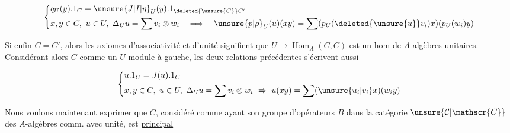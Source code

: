 

\[
\left\{\begin{aligned}
&q_U(y).1_C=\unsure{J|I|\eta}_U(y).1_{\deleted{\unsure{C}}C'}\\
&x,y\in C,\ u\in U,\ \Delta_U u=\sum v_i\otimes w_i\quad\Longrightarrow\quad
\unsure{p|\rho}_U(u)(xy)=\sum(p_U(\deleted{\unsure{u}}v_i)x)(p_U(w_i)y)
\end{aligned}\right.
\]

Si enfin $C=C'$, alors les  axiomes d'associativité et d'unité signifient que  $U\to\operatorname{Hom}_A(C,C)$ est un \uline{hom de $A$-algèbres unitaires}. Considérant \uline{alors $C$ comme un $U$-module}  \uline{à gauche}, les deux relations précédentes s'écrivent aussi

\[
\left\{\begin{aligned}
&u.1_C=J(u).1_C\\
&x,y\in C,\ u\in U,\ \Delta_U u=\sum v_i\otimes w_i\ \Rightarrow\
u(xy)=\sum(\unsure{u_i|v_i}x)(w_i y)
\end{aligned}\right.
\]

Nous voulons maintenant exprimer que $C$, considéré comme ayant son groupe d'opérateurs $B$ dans la catégorie $\unsure{\mathcal{C}|\mathscr{C}}$ des $A$-algèbres comm. avec unité, est   \uline{principal}   

\diagram{\begin{tikzcd}[ampersand replacement=\&]
\deleted{C\otimes_A C}\& \deleted{B}\arrow[l,draw=none,"{\deleted{\longleftarrow}}" description]
\end{tikzcd}}
